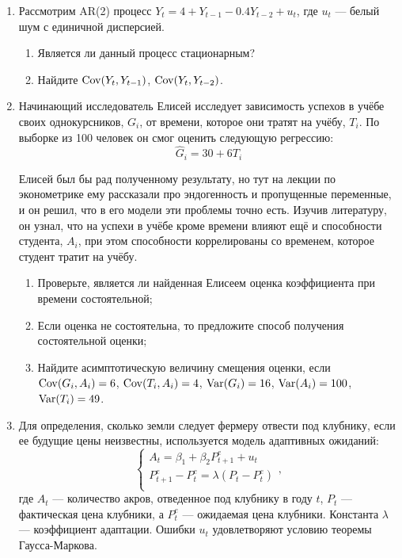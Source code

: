 \documentclass[12pt, a4paper]{article}\usepackage[]{graphicx}\usepackage[]{color}
\begin{document}
\begin{enumerate}



\item Рассмотрим AR(2) процесс $Y_t = 4 + Y_{t-1} - 0.4 Y_{t-2} + u_t$, где $u_t$ — белый шум с единичной дисперсией.
\begin{enumerate}
\item Является ли данный процесс стационарным?
\item Найдите $\operatorname{Cov}(Y_t, Y_{t-1})$, $\operatorname{Cov}(Y_t, Y_{t-2})$.
\end{enumerate}



\item Начинающий исследователь Елисей исследует зависимость успехов в учёбе своих однокурсников, $G_i$, от времени, которое они тратят на учёбу, $T_i$. По выборке из 100 человек он смог оценить следующую регрессию:
\[
\hat G_i = 30 + 6T_i
\]

Елисей был бы рад полученному результату, но тут на лекции по эконометрике ему рассказали про эндогенность и пропущенные переменные, и он решил, что в его модели эти проблемы точно есть. Изучив литературу, он узнал, что на успехи в учёбе кроме времени влияют ещё и способности студента, $A_i$, при этом способности коррелированы со временем, которое студент тратит на учёбу.

\begin{enumerate}
\item Проверьте, является ли найденная Елисеем оценка коэффициента при времени состоятельной;
\item Если оценка не состоятельна, то предложите способ получения состоятельной оценки;
\item Найдите асимптотическую величину смещения оценки, если $\operatorname{Cov}(G_i, A_i) = 6$, $\operatorname{Cov}(T_i, A_i) = 4$, $\operatorname{Var}(G_i) = 16$, $\operatorname{Var}(A_i) = 100$, $\operatorname{Var}(T_i) = 49$.
\end{enumerate}


\item Для определения, сколько земли следует фермеру отвести под клубнику, если ее будущие цены неизвестны, используется  модель адаптивных ожиданий:
\[
\begin{cases}
A_t = \beta_1 + \beta_2 P_{t+1}^e + u_t \\
P_{t+1}^e - P_{t}^e = \lambda (P_t - P_t^e) \\
\end{cases},
\]
где $A_t$ — количество акров, отведенное под клубнику в году $t$, $P_t$ — фактическая цена клубники, а $P_t^e$ — ожидаемая цена клубники. Константа $\lambda$ — коэффициент адаптации. Ошибки $u_t$ удовлетворяют условию теоремы Гаусса-Маркова.


\end{enumerate}
\end{document}
